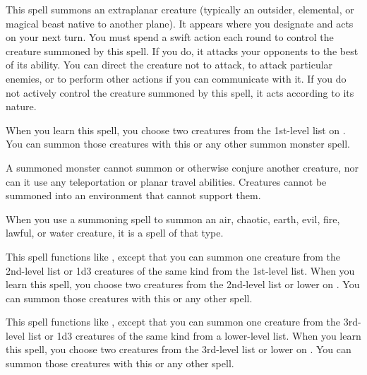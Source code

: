 \hypertarget{spell:summon monster}{}
\spelldur{\durshort \dismissable}
\begin{spelleffect}
    This spell summons an extraplanar creature (typically an outsider, elemental, or magical beast native to another plane). It appears where you designate and acts on your next turn. You must spend a swift action each round to control the creature summoned by this spell. If you do, it attacks your opponents to the best of its ability. You can direct the creature not to attack, to attack particular enemies, or to perform other actions if you can communicate with it. If you do not actively control the creature summoned by this spell, it acts according to its nature.
    \par When you learn this spell, you choose two creatures from the 1st-level list on . You can summon those creatures with this or any other summon monster spell.
    \par A summoned monster cannot summon or otherwise conjure another creature, nor can it use any teleportation or planar travel abilities. Creatures cannot be summoned into an environment that cannot support them.
    \par When you use a summoning spell to summon an air, chaotic, earth, evil, fire, lawful, or water creature, it is a spell of that type.
\end{spelleffect}

\begin{spelleffect}
    This spell functions like , except that you can summon one creature from the 2nd-level list or 1d3 creatures of the same kind from the 1st-level list. When you learn this spell, you choose two creatures from the 2nd-level list or lower on . You can summon those creatures with this or any other  spell.
\end{spelleffect}

\begin{spelleffect}
    This spell functions like , except that you can summon one creature from the 3rd-level list or 1d3 creatures of the same kind from a lower-level list. When you learn this spell, you choose two creatures from the 3rd-level list or lower on . You can summon those creatures with this or any other  spell.
\end{spelleffect}

